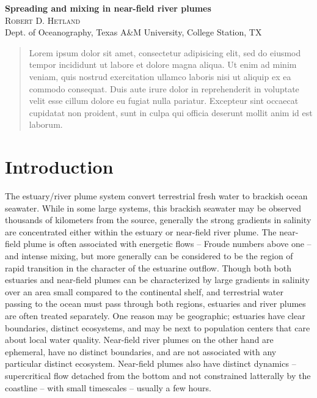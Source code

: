\documentclass[12pt]{article}
\begin{document}
\vfill
\noindent
{\large\bfseries Spreading and mixing in near-field river plumes}\\
\noindent
{\scshape Robert D. Hetland}\\
\noindent
{\footnotesize Dept. of Oceanography, Texas A\&M University, College Station, TX}


\begin{abstract}
  \small{Lorem ipsum dolor sit amet, consectetur adipisicing elit, sed do eiusmod tempor incididunt ut labore et dolore magna aliqua. Ut enim ad minim veniam, quis nostrud exercitation ullamco laboris nisi ut aliquip ex ea commodo consequat. Duis aute irure dolor in reprehenderit in voluptate velit esse cillum dolore eu fugiat nulla pariatur. Excepteur sint occaecat cupidatat non proident, sunt in culpa qui officia deserunt mollit anim id est laborum.}
\end{abstract}


\section{Introduction}

The estuary/river plume system convert terrestrial fresh water to brackish ocean seawater. While in some large systems, this brackish seawater may be observed thousands of kilometers from the source, generally the strong gradients in salinity are concentrated either within the estuary or near-field river plume. The near-field plume is often associated with energetic flows -- Froude numbers above one -- and intense mixing, but more generally can be considered to be the region of rapid transition in the character of the estuarine outflow. Though both both estuaries and near-field plumes can be characterized by large gradients in salinity over an area small compared to the continental shelf, and terrestrial water passing to the ocean must pass through both regions, estuaries and river plumes are often treated separately. One reason may be geographic; estuaries have clear boundaries, distinct ecosystems, and may be next to population centers that care about local water quality. Near-field river plumes on the other hand are ephemeral, have no distinct boundaries, and are not associated with any particular distinct ecosystem. Near-field plumes also have distinct dynamics -- supercritical flow detached from the bottom and not constrained latterally by the coastline -- with small timescales -- usually a few hours.
\end{document}
